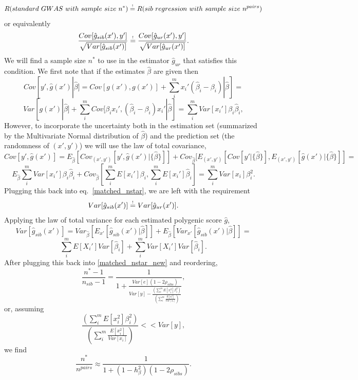 \documentclass[hidelinks, 12pt]{article}
\begin{document}
$$R(standard~GWAS~with~sample~size~n^*) \reqeq R(sib~regression~with~sample~size~n^{pairs})$$
or equivalently
\begin{equation}
\label{matched_nstar}
\frac{Cov[\hat{g}_{sib}(x'),y']}{\sqrt{Var[\hat{g}_{sib}(x')]}} \reqeq \frac{Cov[\hat{g}_{ur}(x'),y']}{\sqrt{Var[\hat{g}_{ur}(x')]}}.
\end{equation}
We will find a sample size $n^*$ to use in the estimator $\hat{g}_{ur}$ that satisfies this condition.  We first note that if the estimates $\hat{\beta}$ are given then
$$ Cov[y',\hat{g}(x')|\hat{\beta}]=Cov[g(x'),g(x')]+\sum_i^m{x_i'(\hat{\beta}_i-\beta_i)}|\hat{\beta}] = $$
$$Var[g(x')|\hat{\beta}]+\sum_i^m{Cov[\beta_ix_i',(\hat{\beta}_i-\beta_i)x_i'}|\hat{\beta}]=\sum_i^mVar[x_i']\beta_i\hat{\beta}_i,$$
However, to incorporate the uncertainty both in the estimation set (summarized by the Multivariate Normal distribution of $\hat{\beta}$) and the prediction set (the randomness of $(x',y')$) we will use the law of total covariance,
$$ Cov[y',\hat{g}(x')]=E_{\hat{\beta}}[Cov_{(x',y')}[y',\hat{g}(x')|\{\hat{\beta}\}]]+Cov_{\hat{\beta}}[E_{(x',y')}[Cov[y'|\{\hat{\beta}\}],E_{(x',y')}[\hat{g}(x')|\{\hat{\beta}\}]]=$$
$$E_{\hat{\beta}}\sum_i^mVar[x_i']\beta_i\hat{\beta}_i+Cov_{\hat{\beta}}[\sum_i^mE[x_i']\beta_i,\sum_i^mE[x_i']\hat{\beta}_i]=\sum_i^mVar[x_i]\beta_i^2.$$
Plugging this back into eq.~\ref{matched_nstar}, we are left with the requirement 
\begin{equation}
\label{matched_nstar_new}
Var[\hat{g}_{sib}(x')] \reqeq Var[\hat{g}_{ur}(x')].
\end{equation}
Applying the law of total variance for each estimated polygenic score $\hat{g}$,
$$Var[\hat{g}_{sib}(x')] =Var_{\hat{\beta}}[E_{x'}[\hat{g}_{sib}(x')|\hat{\beta}]]+E_{\hat{\beta}}[Var_{x'}[\hat{g}_{sib}(x')|\hat{\beta}]] =$$
$$\sum_i^mE[X_i']Var[\hat{\beta}_i]+\sum_i^mVar[X_i']Var[\hat{\beta}_i].$$
After plugging this back into \ref{matched_nstar_new} and reordering, 
$$\frac{n^*-1}{n_{sib}-1}=\frac{1}{1+\frac{Var[e](1-2\rho_{sibs})}{Var[y]-\frac{(\sum_i^mE[x_i^2]\beta_i^2)}{(\sum_i^m\frac{E[x_i^2]}{Var[x_i]})}}},$$
or, assuming 
$$\frac{(\sum_i^mE[x_i^2]\beta_i^2)}{(\sum_i^m\frac{E[x_i^2]}{Var[x_i]})} << Var[y],$$ 
we find
\begin{equation}
\label{final_nstar_just_direct}
\frac{n^*}{n^{pairs}} \approx \frac{1}{1+(1-h_{\beta}^2)(1-2\rho_{sibs})}.
\end{equation}
\end{document}
